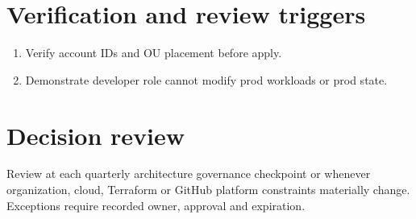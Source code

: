 \documentclass[11pt]{article}
\begin{document}
\section*{Verification and review triggers}
\begin{enumerate}[leftmargin=*]
\item Verify account IDs and OU placement before apply.
\item Demonstrate developer role cannot modify prod workloads or prod state.
\end{enumerate}
\section*{Decision review}
Review at each quarterly architecture governance checkpoint or whenever organization, cloud, Terraform or GitHub platform constraints materially change. Exceptions require recorded owner, approval and expiration.
\end{document}
